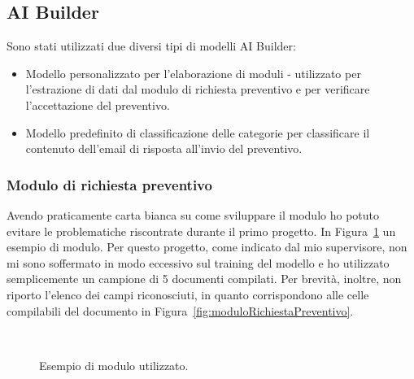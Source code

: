 \subsection{AI Builder}
Sono stati utilizzati due diversi tipi di modelli AI Builder:
\begin{itemize}
  \item Modello personalizzato per l'elaborazione di moduli - utilizzato per l'estrazione di dati dal modulo di richiesta preventivo e per verificare l'accettazione del preventivo.
  \item Modello predefinito di classificazione delle categorie per classificare il contenuto dell'email di risposta all'invio del preventivo.
\end{itemize}

\subsubsection{Modulo di richiesta preventivo}
Avendo praticamente carta bianca su come sviluppare il modulo ho potuto evitare le problematiche riscontrate durante il primo progetto. In Figura~\ref{fig:moduloRichiestaPreventivo} un esempio di modulo. Per questo progetto, come indicato dal mio supervisore, non mi sono soffermato in modo eccessivo sul training del modello e ho utilizzato semplicemente un campione di \num{5} documenti compilati. Per brevità, inoltre, non riporto l'elenco dei campi riconosciuti, in quanto corrispondono alle celle compilabili del documento in Figura~\vref{fig:moduloRichiestaPreventivo}.

\begin{figure}[ht!]
  \centering
     \quad
     \\
  \caption{Esempio di modulo utilizzato.}
  \label{fig:moduloRichiestaPreventivo}
\end{figure}

